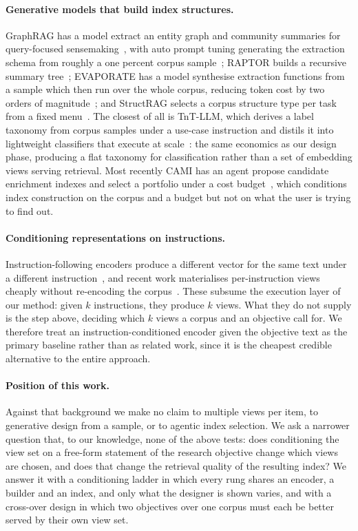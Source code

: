 \paragraph{Generative models that build index structures.}
GraphRAG has a model extract an entity graph and community summaries for
query-focused sensemaking~\cite{edge2024graphrag}, with auto prompt tuning
generating the extraction schema from roughly a one percent corpus
sample~\cite{microsoft2024autotune}; RAPTOR builds a recursive summary
tree~\cite{sarthi2024raptor}; EVAPORATE has a model synthesise extraction
functions from a sample which then run over the whole corpus, reducing token cost
by two orders of magnitude~\cite{arora2023evaporate}; and StructRAG selects a
corpus structure type per task from a fixed menu~\cite{li2024structrag}. The
closest of all is TnT-LLM, which derives a label taxonomy from corpus samples
under a use-case instruction and distils it into lightweight classifiers that
execute at scale~\cite{wan2024tntllm}: the same economics as our design phase,
producing a flat taxonomy for classification rather than a set of embedding views
serving retrieval. Most recently CAMI has an agent propose candidate enrichment
indexes and select a portfolio under a cost budget~\cite{qidwai2026cami}, which
conditions index construction on the corpus and a budget but not on what the user
is trying to find out.

\paragraph{Conditioning representations on instructions.}
Instruction-following encoders produce a different vector for the same text under
a different instruction~\cite{su2023instructor,weller2024followir,weller2025promptriever},
and recent work materialises per-instruction views cheaply without re-encoding
the corpus~\cite{sun2025gstransform}. These subsume the execution layer of our
method: given $k$ instructions, they produce $k$ views. What they do not supply is
the step above, deciding which $k$ views a corpus and an objective call for. We
therefore treat an instruction-conditioned encoder given the objective text as the
primary baseline rather than as related work, since it is the cheapest credible
alternative to the entire approach.

\paragraph{Position of this work.}
Against that background we make no claim to multiple views per item, to generative
design from a sample, or to agentic index selection. We ask a narrower question
that, to our knowledge, none of the above tests: does conditioning the view set on
a free-form statement of the research objective change which views are chosen, and
does that change the retrieval quality of the resulting index? We answer it with a
conditioning ladder in which every rung shares an encoder, a builder and an index,
and only what the designer is shown varies, and with a cross-over design in which
two objectives over one corpus must each be better served by their own view set.
